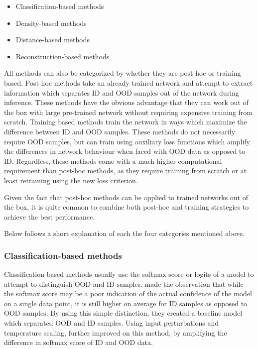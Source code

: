 \documentclass[UKenglish]{uiomasterthesis} %
\theoremstyle{definition}
\begin{document}
\begin{itemize}
  \item Classification-based methods
  \item Density-based methods
  \item Distance-based methods
  \item Reconstruction-based methods
\end{itemize}

All methods can also be categorized by whether they are post-hoc or training based. Post-hoc methods take an already trained network and attempt to extract information which separates ID and OOD samples out of the network during inference. These methods have the obvious advantage that they can work out of the box with large pre-trained network without requiring expensive training from scratch. Training based methods train the network in ways which maximize the difference between ID and OOD samples. These methods do not necessarily require OOD samples, but can train using auxiliary loss functions which amplify the differences in network behaviour when faced with OOD data as opposed to ID. Regardless, these methods come with a much higher computational requirement than post-hoc methods, as they require training from scratch or at least retraining using the new loss criterion. 

Given the fact that post-hoc methods can be applied to trained networks out of the box, it is quite common to combine both post-hoc and training strategies to achieve the best performance.


Below follows a short explanation of each the four categories mentioned above.
\\

\subsubsection{Classification-based methods}

Classification-based methods usually use the softmax score or logits of a model to attempt to distinguish OOD and ID samples. \cite{oodbaseline} made the observation that while the softmax score may be a poor indication of the actual confidence of the model on a single data point, it is still higher on average for ID samples as opposed to OOD samples. By using this simple distinction, they created a baseline model which separated OOD and ID samples. Using input perturbations and temperature scaling, \cite{odin} further improved on this method, by amplifying the difference in softmax score of ID and OOD data. 
\end{document}
